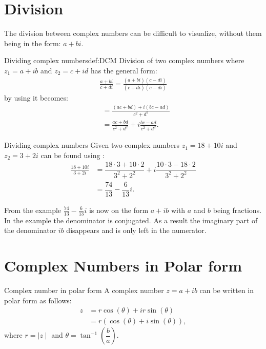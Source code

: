 \section{Division}
The division between complex numbers can be difficult to visualize, without them being in the form: $a + bi$. 
\begin{definition}{Dividing complex numbers}{def:DCM}
Division of two complex numbers where $z_1=a+ib$ and $z_2=c+id$ has the general form:
\begin{align*}
\frac{a + bi}{c + di} = \frac{(a+bi)(c-di)}{(c+di)(c-di)}
\end{align*}
by using  it becomes:  
\begin{align*}
&= \frac{(ac+bd)+i(bc-ad)}{c^2+d^2}							\\[1em]
&= \frac{ac+bd}{c^2+d^2}+i \frac{bc-ad}{c^2+d^2}.				
\end{align*}
\end{definition}
\begin{example}{Dividing complex numbers}{}
Given two complex numbers $z_1=18+10i$ and $z_2=3+2i$ can be found using :
\begin{align*}
\frac{18 + 10i}{3 + 2i} &= \dfrac{18\cdot3+10\cdot2}{3^2+2^2}+i\dfrac{10\cdot3-18\cdot2}{3^2+2^2}
\\
&=\dfrac{74}{13}-\dfrac{6}{13}i.
\end{align*}
\end{example}


\noindent From the example $\frac{74}{13} - \frac{6}{13}i$ is now on the form $a+ib$ with $a$ and $b$ being fractions. In the example the denominator is conjugated. As a result the imaginary part of the denominator $ib$ disappears and is only left in the numerator. 


\section{Complex Numbers in Polar form}

\begin{definition}{Complex number in polar form}{}
A complex number $z=a+ib$ can be written in polar form as follows:
\begin{align}
z&=r\cos(\theta)+ir\sin(\theta)
\\
&=r\left(\cos(\theta)+i\sin(\theta)\right),
\end{align}
where $r=\mid z \mid$ and $\theta=\tan^{-1}\left(\dfrac{b}{a} \right).$
\end{definition}

